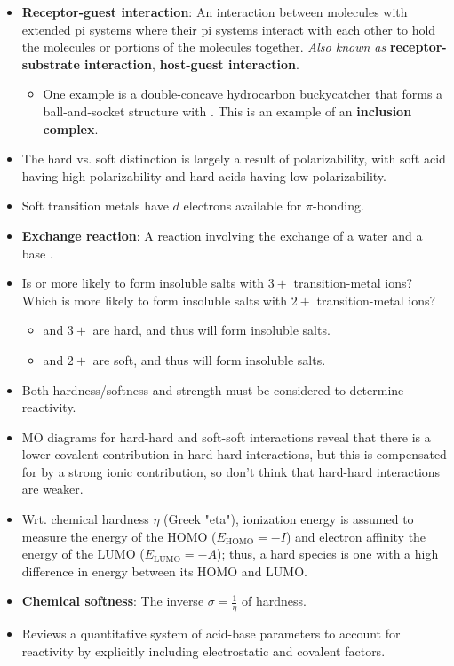 \documentclass[../notes.tex]{subfiles}
\begin{document}
\begin{itemize}
    \item \textbf{Receptor-guest interaction}: An interaction between molecules with extended pi systems where their pi systems interact with each other to hold the molecules or portions of the molecules together. \emph{Also known as} \textbf{receptor-substrate interaction}, \textbf{host-guest interaction}.
    \begin{itemize}
        \item One example is a double-concave hydrocarbon buckycatcher that forms a ball-and-socket structure with . This is an example of an \textbf{inclusion complex}.
    \end{itemize}
    \item The hard vs. soft distinction is largely a result of polarizability, with soft acid having high polarizability and hard acids having low polarizability.
    \item Soft transition metals have $d$ electrons available for $\pi$-bonding.
    \item \textbf{Exchange reaction}: A reaction involving the exchange of a water and a base .
    \item Is  or  more likely to form insoluble salts with $3+$ transition-metal ions? Which is more likely to form insoluble salts with $2+$ transition-metal ions?
    \begin{itemize}
        \item {} and $3+$ are hard, and thus will form insoluble salts.
        \item {} and $2+$ are soft, and thus will form insoluble salts.
    \end{itemize}
    \item Both hardness/softness and strength must be considered to determine reactivity.
    \item MO diagrams for hard-hard and soft-soft interactions reveal that there is a lower covalent contribution in hard-hard interactions, but this is compensated for by a strong ionic contribution, so don't think that hard-hard interactions are weaker.
    \item Wrt. chemical hardness $\eta$ (Greek "eta"), ionization energy is assumed to measure the energy of the HOMO ($E_\text{HOMO}=-I$) and electron affinity the energy of the LUMO ($E_\text{LUMO}=-A$); thus, a hard species is one with a high difference in energy between its HOMO and LUMO.
    \item \textbf{Chemical softness}: The inverse $\sigma=\frac{1}{\eta}$ of hardness.
    \item Reviews a quantitative system of acid-base parameters to account for reactivity by explicitly including electrostatic and covalent factors.
\end{itemize}
\end{document}
